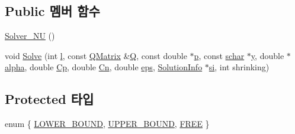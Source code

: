 \subsection*{Public 멤버 함수}
\begin{DoxyCompactItemize}
\item 
\hyperlink{class_solver___n_u_a4f05e99c9939dcdf36840f27b1a9dde7}{Solver\+\_\+\+N\+U} ()
\item 
void \hyperlink{class_solver___n_u_a3852f49023c0032934508156d7a9f132}{Solve} (int \hyperlink{class_solver_a88832d45b6de977b1cbb2afd4c0e494c}{l}, const \hyperlink{class_q_matrix}{Q\+Matrix} \&\hyperlink{class_solver_a2d3461718f0570bdc47f5dfb31d61e0a}{Q}, const double $\ast$\hyperlink{class_solver_a882cce072f56679880d409e3e73f7ae8}{p}, const \hyperlink{svm_8cpp_a0fd9ce9d735064461bebfe6037026093}{schar} $\ast$\hyperlink{class_solver_a3acc1043d06dedf87f054ff3eea5c426}{y}, double $\ast$\hyperlink{class_solver_a00d7a7cefa2504d41c7db6cd7cc6b428}{alpha}, double \hyperlink{class_solver_a2e45dbea8be469bf8247e14768549dd5}{Cp}, double \hyperlink{class_solver_a38d741d194839fb445f982dd78e0b97b}{Cn}, double \hyperlink{class_solver_a718333cc2c1d40abf9c292a788cba1e5}{eps}, \hyperlink{struct_solver_1_1_solution_info}{Solution\+Info} $\ast$\hyperlink{class_solver___n_u_ab4f51d421dfaec61482401ff5ef0d86c}{si}, int shrinking)
\end{DoxyCompactItemize}
\subsection*{Protected 타입}
\begin{DoxyCompactItemize}
\item 
enum \{ \hyperlink{class_solver_a86c1a7637bc803ef8496c7dbf7f00b03aeb78558e05ec0672378c3e801e866560}{L\+O\+W\+E\+R\+\_\+\+B\+O\+U\+N\+D}, 
\hyperlink{class_solver_a86c1a7637bc803ef8496c7dbf7f00b03aef825a32b2471cdb0724cfa9c1f051fd}{U\+P\+P\+E\+R\+\_\+\+B\+O\+U\+N\+D}, 
\hyperlink{class_solver_a86c1a7637bc803ef8496c7dbf7f00b03a904f6af2170b6f900fbd3d46cd055c76}{F\+R\+E\+E}
 \}
\end{DoxyCompactItemize}
